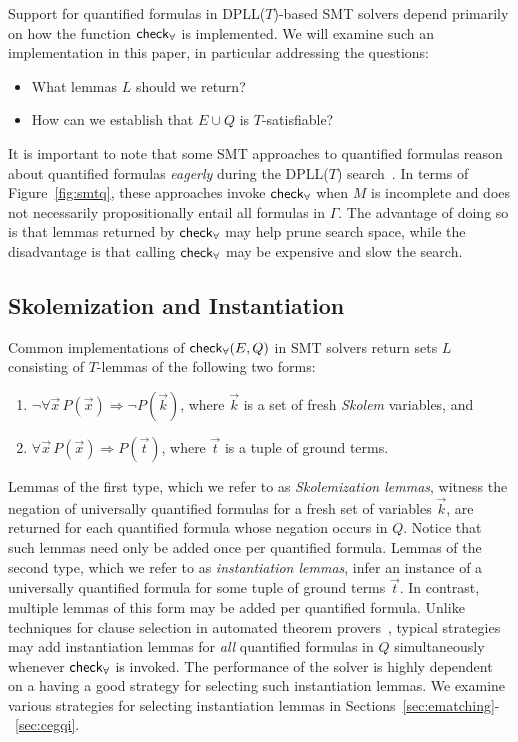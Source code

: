 \documentclass[oribibl]{llncs}
\begin{document}
Support for quantified formulas in DPLL($T$)-based SMT solvers depend primarily on how the function $\small\mathsf{check}_\forall$ is implemented.
We will examine such an implementation in this paper, in particular addressing the questions:
\begin{itemize}
\item What lemmas $L$ should we return?
\item How can we establish that $E \cup Q$ is $T$-satisfiable?
\end{itemize}

It is important to note that some SMT approaches to quantified formulas
reason about quantified formulas \emph{eagerly} during the DPLL($T$) search~\cite{MouraBjoerner07}.
In terms of Figure~\ref{fig:smtq}, these approaches invoke $\small\mathsf{check}_\forall$
when $M$ is incomplete and does not necessarily propositionally entail all formulas in $\Gamma$.
The advantage of doing so is that lemmas returned by $\small\mathsf{check}_\forall$ may help prune search space,
while the disadvantage is that calling $\small\mathsf{check}_\forall$ may be expensive and slow the search.

\subsection{Skolemization and Instantiation}
Common implementations of $\small\mathsf{check}_\forall( E, Q )$ in SMT solvers return sets $L$ consisting of $T$-lemmas of the following two forms:
\begin{enumerate}
\item $\neg \forall \vec x\, P( \vec x ) \Rightarrow \neg P( \vec k )$, where $\vec k$ is a set of fresh \emph{Skolem} variables, and
\item $\forall \vec x\, P( \vec x ) \Rightarrow P( \vec t )$, where $\vec t$ is a tuple of ground terms.
\end{enumerate}
Lemmas of the first type, which we refer to as \emph{Skolemization lemmas},
witness the negation of universally quantified formulas for a fresh set of variables $\vec{k}$,
are returned for each quantified formula whose negation occurs in $Q$.
Notice that such lemmas need only be added once per quantified formula.
Lemmas of the second type, which we refer to as \emph{instantiation lemmas},
infer an instance of a universally quantified formula for some tuple of ground terms $\vec{ t }$.
In contrast, multiple lemmas of this form may be added per quantified formula.
Unlike techniques for clause selection in automated theorem provers~\cite{DBLP:conf/cade/SchulzM16},
typical strategies may add instantiation lemmas for \emph{all} quantified formulas in $Q$ simultaneously whenever $\small\mathsf{check}_\forall$ is invoked.
The performance of the solver is highly dependent on a having a good strategy for selecting such instantiation lemmas.
We examine various strategies for selecting instantiation lemmas in Sections~\ref{sec:ematching}-~\ref{sec:cegqi}.
\end{document}
